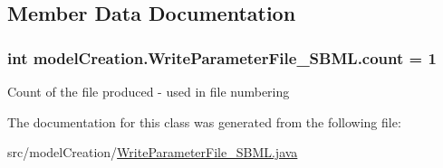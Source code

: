 \subsection{Member Data Documentation}
\hypertarget{classmodelCreation_1_1WriteParameterFile__SBML_a60ecc09393833ed317cdece3fcd0c76e}{}
\subsubsection[{count}]{\setlength{\rightskip}{0pt plus 5cm}int model\+Creation.\+Write\+Parameter\+File\+\_\+\+S\+B\+M\+L.\+count = 1\hspace{0.3cm}{\ttfamily [static]}}\label{classmodelCreation_1_1WriteParameterFile__SBML_a60ecc09393833ed317cdece3fcd0c76e}
Count of the file produced -\/ used in file numbering 

The documentation for this class was generated from the following file\+:\begin{DoxyCompactItemize}
\item 
src/model\+Creation/\hyperlink{WriteParameterFile__SBML_8java}{Write\+Parameter\+File\+\_\+\+S\+B\+M\+L.\+java}\end{DoxyCompactItemize}

